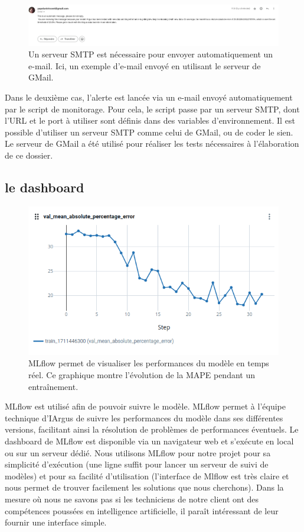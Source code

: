 \documentclass[french]{article}
\begin{document}
    \begin{figure}[h!]
        \includegraphics[width=12cm]{mail}
        \centering
        \caption{Un serveur SMTP est nécessaire pour envoyer automatiquement un e-mail. Ici, un exemple d'e-mail envoyé en utilisant le serveur de GMail.}
    \end{figure}

    Dans le deuxième cas, l'alerte est lancée via un e-mail envoyé automatiquement par le script de monitorage. Pour cela, le script passe par un serveur SMTP, dont l'URL et le port à utiliser sont définis dans des variables d'environnement. Il est possible d'utiliser un serveur SMTP comme celui de GMail, ou de coder le sien. Le serveur de GMail a été utilisé pour réaliser les tests nécessaires à l'élaboration de ce dossier.


    \subsection{le dashboard}

    \begin{figure}[h!]
        \includegraphics[width=12cm]{mlflow}
        \centering
        \caption{MLflow permet de visualiser les performances du modèle en temps réel. Ce graphique montre l'évolution de la MAPE pendant un entraînement.}
    \end{figure}

    MLflow est utilisé afin de pouvoir suivre le modèle. MLflow permet à l'équipe technique d'IArgus de suivre les performances du modèle dans ses différentes versions, facilitant ainsi la résolution de problèmes de performances éventuels. Le dashboard de MLflow est disponible via un navigateur web et s'exécute en local ou sur un serveur dédié. Nous utilisons MLflow pour notre projet pour sa simplicité d'exécution (une ligne suffit pour lancer un serveur de suivi de modèles) et pour sa facilité d'utilisation (l'interface de Mlflow est très claire et nous permet de trouver facilement les solutions que nous cherchons). Dans la mesure où nous ne savons pas si les techniciens de notre client ont des compétences poussées en intelligence artificielle, il paraît intéressant de leur fournir une interface simple.
\end{document}
